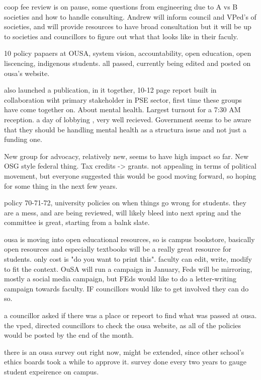 \begin{information}
    coop fee review is on pause, some questions from engineering due to
    A vs B societies and how to handle consulting. Andrew will inform council
    and VPed's of societies, and will provide resources to have broad consultation
    but it will be up to societies and councillors to figure out what that
    looks like in their faculy. 

    10 policy papaers at OUSA, system vision, accountability, open education,
    open liscencing, indigenous students. all passed, currently being edited
    and posted on ousa's website. 

    also launched a publication, in it together, 10-12 page report built in
    collaboration wiht primary stakeholder in PSE sector, first time these
    groups have come together on. About mental health. Largest turnout for a
    7:30 AM reception. a day of lobbying , very well recieved. Government
    seems to be aware that they should be handling mental health as a structura
    issue and not just a funding one.

    New group for advocacy, relatively new, seems to have high impact so far. 
    New OSG style federal thing. Tax credits -> grants. not appealing in
    terms of political movement, but everyone suggested this would be good
    moving forward, so hoping for some thing in the next few years. 

    policy 70-71-72, university policies on when things go wrong for students.
    they are a mess, and are being reviewed, will likely bleed into next
    spring and the committee is great, starting from a balnk slate. 

    ousa is moving into open educational resources, so is campus bookstore, 
    basically open resources and especially textbooks will be a really great
    resource for students. only cost is "do you want to print this". faculty
    can edit, write, modify to fit the context. OuSA will run a campaign in
    January, Feds will be mirroring, mostly a social media campaign, but FEds
    would like to do a letter-writing campaign towards faculty. IF councillors
    would like to get involved they can do so.

    a councillor asked if there was a place or repeort to find what was passed
    at ousa. 
    the vped, directed councillors to check the ousa website, as all of the 
    policies would be posted by the end of the month.

    there is an ousa survey out right now, might be extended, since other
    school's ethics boards took a while to approve it. survey done 
    every two years to gauge student expeirence on campus. 

\end{information}

